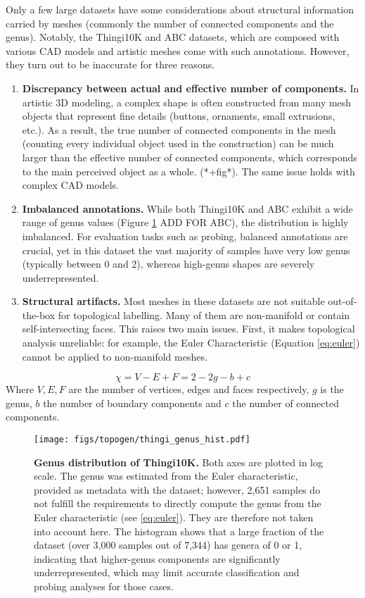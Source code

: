 Only a few large datasets have some considerations about structural information carried by meshes (commonly the number of connected components and the genus). Notably, the Thingi10K and ABC datasets, which are composed with various CAD models and artistic meshes come with such annotations. However, they turn out to be inaccurate for three reasons. 
\begin{enumerate}
  \item \textbf{Discrepancy between actual and effective number of components.} In artistic 3D modeling, a complex shape is often constructed from many mesh objects that represent fine details (buttons, ornaments, small extrusions, etc.). As a result, the true number of connected components in the mesh (counting every individual object used in the construction) can be much larger than the effective number of connected components, which corresponds to the main perceived object as a whole. (*+fig*). The same issue holds with complex CAD models.
  \item \textbf{Imbalanced annotations.} While both Thingi10K and ABC exhibit a wide range of genus values (Figure \ref{fig:thingi-genus} ADD FOR ABC), the distribution is highly imbalanced. For evaluation tasks such as probing, balanced annotations are crucial, yet in this dataset the vast majority of samples have very low genus (typically between 0 and 2), whereas high-genus shapes are severely underrepresented.
  \item \textbf{Structural artifacts.} Most meshes in these datasets are not suitable out-of-the-box for topological labelling. Many of them are non-manifold or contain self-intersecting faces. This raises two main issues. First, it makes topological analysis unreliable: for example, the Euler Characteristic (Equation \ref{eq:euler}) cannot be applied to non-manifold meshes.
\end{enumerate}
\begin{equation}
  \chi = V - E + F = 2 - 2g - b + c
  \label{eq:euler}
\end{equation}
Where $V, E, F$ are the number of vertices, edges and faces respectively, $g$ is the genus, $b$ the number of boundary components and $c$ the number of connected components.

\begin{figure}[t]
  \centering
  \texttt{[image: figs/topogen/thingi\_genus\_hist.pdf]}
   \caption{\textbf{Genus distribution of Thingi10K.} Both axes are plotted in log scale. The genus was estimated from the Euler characteristic, provided as metadata with the dataset; however, 2,651 samples do not fulfill the requirements to directly compute the genus from the Euler characteristic (see \ref{eq:euler}). They are therefore not taken into account here. The histogram shows that a large fraction of the dataset (over 3,000 samples out of 7,344) has genera of 0 or 1, indicating that higher-genus components are significantly underrepresented, which may limit accurate classification and probing analyses for those cases.}
   \label{fig:thingi-genus}
\end{figure}


